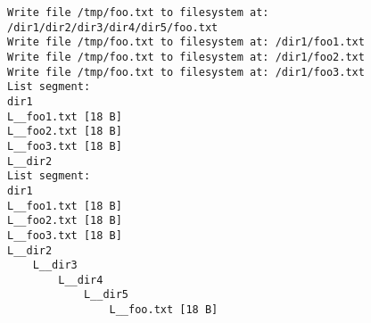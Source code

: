 \begin{lstlisting}
Write file /tmp/foo.txt to filesystem at: /dir1/dir2/dir3/dir4/dir5/foo.txt
Write file /tmp/foo.txt to filesystem at: /dir1/foo1.txt
Write file /tmp/foo.txt to filesystem at: /dir1/foo2.txt
Write file /tmp/foo.txt to filesystem at: /dir1/foo3.txt
List segment:
dir1
L__foo1.txt [18 B]
L__foo2.txt [18 B]
L__foo3.txt [18 B]
L__dir2
List segment:
dir1
L__foo1.txt [18 B]
L__foo2.txt [18 B]
L__foo3.txt [18 B]
L__dir2
    L__dir3
        L__dir4
            L__dir5
                L__foo.txt [18 B]
\end{lstlisting}

\newpage